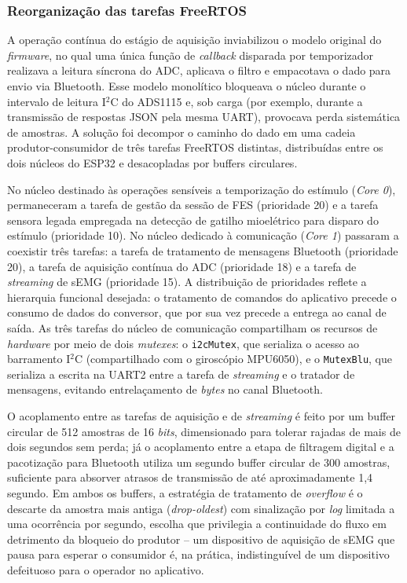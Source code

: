 \subsubsection{Reorganização das tarefas FreeRTOS}\label{subsubsec:NETarefas}

A operação contínua do estágio de aquisição inviabilizou o modelo original do \textit{firmware}, no qual uma única função de \textit{callback} disparada por temporizador realizava a leitura síncrona do ADC, aplicava o filtro e empacotava o dado para envio via Bluetooth. Esse modelo monolítico bloqueava o núcleo durante o intervalo de leitura I$^2$C do ADS1115 e, sob carga (por exemplo, durante a transmissão de respostas JSON pela mesma UART), provocava perda sistemática de amostras. A solução foi decompor o caminho do dado em uma cadeia produtor-consumidor de três tarefas FreeRTOS distintas, distribuídas entre os dois núcleos do ESP32 e desacopladas por buffers circulares.

No núcleo destinado às operações sensíveis a temporização do estímulo (\textit{Core 0}), permaneceram a tarefa de gestão da sessão de FES (prioridade 20) e a tarefa sensora legada empregada na detecção de gatilho mioelétrico para disparo do estímulo (prioridade 10). No núcleo dedicado à comunicação (\textit{Core 1}) passaram a coexistir três tarefas: a tarefa de tratamento de mensagens Bluetooth (prioridade 20), a tarefa de aquisição contínua do ADC (prioridade 18) e a tarefa de \textit{streaming} de sEMG (prioridade 15). A distribuição de prioridades reflete a hierarquia funcional desejada: o tratamento de comandos do aplicativo precede o consumo de dados do conversor, que por sua vez precede a entrega ao canal de saída. As três tarefas do núcleo de comunicação compartilham os recursos de \textit{hardware} por meio de dois \textit{mutexes}: o \texttt{i2cMutex}, que serializa o acesso ao barramento I$^2$C (compartilhado com o giroscópio MPU6050), e o \texttt{MutexBlu}, que serializa a escrita na UART2 entre a tarefa de \textit{streaming} e o tratador de mensagens, evitando entrelaçamento de \textit{bytes} no canal Bluetooth.

O acoplamento entre as tarefas de aquisição e de \textit{streaming} é feito por um buffer circular de 512 amostras de 16 \textit{bits}, dimensionado para tolerar rajadas de mais de dois segundos sem perda; já o acoplamento entre a etapa de filtragem digital e a pacotização para Bluetooth utiliza um segundo buffer circular de 300 amostras, suficiente para absorver atrasos de transmissão de até aproximadamente 1,4\,segundo. Em ambos os buffers, a estratégia de tratamento de \textit{overflow} é o descarte da amostra mais antiga (\textit{drop-oldest}) com sinalização por \textit{log} limitada a uma ocorrência por segundo, escolha que privilegia a continuidade do fluxo em detrimento da bloqueio do produtor -- um dispositivo de aquisição de sEMG que pausa para esperar o consumidor é, na prática, indistinguível de um dispositivo defeituoso para o operador no aplicativo.

